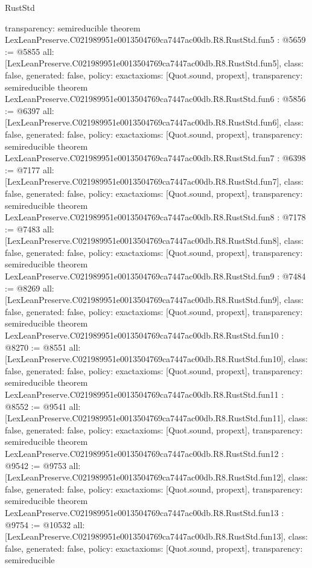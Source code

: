 \begin{lexlean}{RustStd}
\begin{coremodule}
{  transparency: semireducible
}
theorem LexLeanPreserve.C021989951e0013504769ca7447ac00db.R8.RustStd.fun5 : @5659 := @5855 {
  all: [LexLeanPreserve.C021989951e0013504769ca7447ac00db.R8.RustStd.fun5],
  class: false,
  generated: false,
  policy: exact{axioms: [Quot.sound, propext]},
  transparency: semireducible
}
theorem LexLeanPreserve.C021989951e0013504769ca7447ac00db.R8.RustStd.fun6 : @5856 := @6397 {
  all: [LexLeanPreserve.C021989951e0013504769ca7447ac00db.R8.RustStd.fun6],
  class: false,
  generated: false,
  policy: exact{axioms: [Quot.sound, propext]},
  transparency: semireducible
}
theorem LexLeanPreserve.C021989951e0013504769ca7447ac00db.R8.RustStd.fun7 : @6398 := @7177 {
  all: [LexLeanPreserve.C021989951e0013504769ca7447ac00db.R8.RustStd.fun7],
  class: false,
  generated: false,
  policy: exact{axioms: [Quot.sound, propext]},
  transparency: semireducible
}
theorem LexLeanPreserve.C021989951e0013504769ca7447ac00db.R8.RustStd.fun8 : @7178 := @7483 {
  all: [LexLeanPreserve.C021989951e0013504769ca7447ac00db.R8.RustStd.fun8],
  class: false,
  generated: false,
  policy: exact{axioms: [Quot.sound, propext]},
  transparency: semireducible
}
theorem LexLeanPreserve.C021989951e0013504769ca7447ac00db.R8.RustStd.fun9 : @7484 := @8269 {
  all: [LexLeanPreserve.C021989951e0013504769ca7447ac00db.R8.RustStd.fun9],
  class: false,
  generated: false,
  policy: exact{axioms: [Quot.sound, propext]},
  transparency: semireducible
}
theorem LexLeanPreserve.C021989951e0013504769ca7447ac00db.R8.RustStd.fun10 : @8270 := @8551 {
  all: [LexLeanPreserve.C021989951e0013504769ca7447ac00db.R8.RustStd.fun10],
  class: false,
  generated: false,
  policy: exact{axioms: [Quot.sound, propext]},
  transparency: semireducible
}
theorem LexLeanPreserve.C021989951e0013504769ca7447ac00db.R8.RustStd.fun11 : @8552 := @9541 {
  all: [LexLeanPreserve.C021989951e0013504769ca7447ac00db.R8.RustStd.fun11],
  class: false,
  generated: false,
  policy: exact{axioms: [Quot.sound, propext]},
  transparency: semireducible
}
theorem LexLeanPreserve.C021989951e0013504769ca7447ac00db.R8.RustStd.fun12 : @9542 := @9753 {
  all: [LexLeanPreserve.C021989951e0013504769ca7447ac00db.R8.RustStd.fun12],
  class: false,
  generated: false,
  policy: exact{axioms: [Quot.sound, propext]},
  transparency: semireducible
}
theorem LexLeanPreserve.C021989951e0013504769ca7447ac00db.R8.RustStd.fun13 : @9754 := @10532 {
  all: [LexLeanPreserve.C021989951e0013504769ca7447ac00db.R8.RustStd.fun13],
  class: false,
  generated: false,
  policy: exact{axioms: [Quot.sound, propext]},
  transparency: semireducible
}
\end{coremodule}
\end{lexlean}
